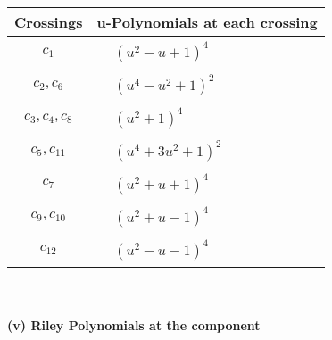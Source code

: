 \documentclass[1p]{elsarticle_modified}
\theoremstyle{definition}
\begin{document}
\begin{tabular}{m{50pt}|m{274pt}}
Crossings & \hspace{64pt}u-Polynomials at each crossing \\
\hline $$\begin{aligned}c_{1}\end{aligned}$$&$\begin{aligned}
&(u^2- u+1)^4
\end{aligned}$\\
\hline $$\begin{aligned}c_{2},c_{6}\end{aligned}$$&$\begin{aligned}
&(u^4- u^2+1)^2
\end{aligned}$\\
\hline $$\begin{aligned}c_{3},c_{4},c_{8}\end{aligned}$$&$\begin{aligned}
&(u^2+1)^4
\end{aligned}$\\
\hline $$\begin{aligned}c_{5},c_{11}\end{aligned}$$&$\begin{aligned}
&(u^4+3 u^2+1)^2
\end{aligned}$\\
\hline $$\begin{aligned}c_{7}\end{aligned}$$&$\begin{aligned}
&(u^2+u+1)^4
\end{aligned}$\\
\hline $$\begin{aligned}c_{9},c_{10}\end{aligned}$$&$\begin{aligned}
&(u^2+u-1)^4
\end{aligned}$\\
\hline $$\begin{aligned}c_{12}\end{aligned}$$&$\begin{aligned}
&(u^2- u-1)^4
\end{aligned}$\\
\hline
\end{tabular}\\~\\
\newpage\renewcommand{\arraystretch}{1}
\flushleft \textbf{(v) Riley Polynomials at the component}\newline \\
\end{document}
